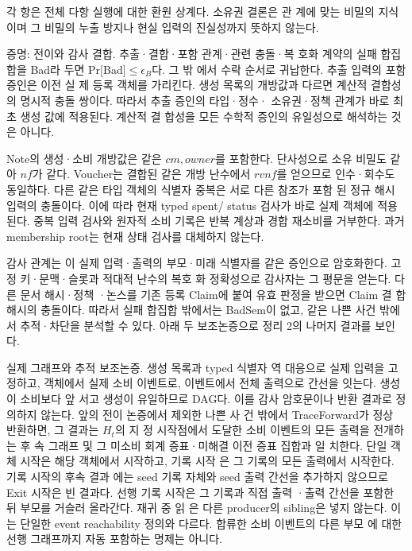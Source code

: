 각 항은 전체 다항 실행에 대한 환원 상계다. 소유권 결론은 관
계에 맞는 비밀의 지식이며 그 비밀의 누출 방지나 현실 입력의
진실성까지 뜻하지 않는다.

증명: 전이와 감사 결합. 추출·결합·포함 관계·관련 충돌·복
호화 계약의 실패 합집합을 Bad라 두면 Pr\([\)Bad\(]≤\epsilon _{B}\)다. 그 밖
에서 수락 순서로 귀납한다. 추출 입력의 포함 증인은 이전 실
제 등록 객체를 가리킨다. 생성 목록의 개방값과 다르면 계산적
결합성의 명시적 충돌 쌍이다. 따라서 추출 증인의 타입·정수·
소유권·정책 관계가 바로 최초 생성 값에 적용된다. 계산적 결
합성을 모든 수학적 증인의 유일성으로 해석하는 것은 아니다.

Note의 생성·소비 개방값은 같은 \(cm,owner\)를 포함한다.
단사성으로 소유 비밀도 같아 \(nf\)가 같다. Voucher는 결합된
같은 개방 난수에서 \(rvnf\)를 얻으므로 인수·회수도 동일하다.
다른 같은 타입 객체의 식별자 중복은 서로 다른 참조가 포함
된 정규 해시 입력의 충돌이다. 이에 따라 현재 typed spent/
status 검사가 바로 실제 객체에 적용된다. 중복 입력 검사와
원자적 소비 기록은 반복 계상과 경합 재소비를 거부한다. 과거
membership root는 현재 상태 검사를 대체하지 않는다.

감사 관계는 이 실제 입력·출력의 부모·미래 식별자를 같은
증인으로 암호화한다. 고정 키·문맥·슬롯과 적대적 난수의 복호
화 정확성으로 감사자는 그 평문을 얻는다. 다른 문서 해시·정책
·논스를 기존 등록 Claim에 붙여 유효 판정을 받으면 Claim 결
합 해시의 충돌이다. 따라서 실패 합집합 밖에서는 BadSem이
없고, 같은 나쁜 사건 밖에서 추적·차단을 분석할 수 있다. 아래
두 보조논증으로 정리 2의 나머지 결과를 보인다.

실제 그래프와 추적 보조논증. 생성 목록과 typed 식별자 역
대응으로 실제 입력을 고정하고, 객체에서 실제 소비 이벤트로,
이벤트에서 전체 출력으로 간선을 잇는다. 생성이 소비보다 앞
서고 생성이 유일하므로 DAG다. 이를 감사 암호문이나 반환
결과로 정의하지 않는다. 앞의 전이 논증에서 제외한 나쁜 사
건 밖에서 TraceForward가 정상 반환하면, 그 결과는 \(H_{t}\)의 지
정 시작점에서 도달한 소비 이벤트의 모든 출력을 전개하는 후
속 그래프 및 그 미소비 회계 증표·미해결 이전 증표 집합과 일
치한다. 단일 객체 시작은 해당 객체에서 시작하고, 기록 시작
은 그 기록의 모든 출력에서 시작한다. 기록 시작의 후속 결과
에는 seed 기록 자체와 seed 출력 간선을 추가하지 않으므로
Exit 시작은 빈 결과다. 선행 기록 시작은 그 기록과 직접 출력
·출력 간선을 포함한 뒤 부모를 거슬러 올라간다. 재귀 중 읽
은 다른 producer의 sibling은 넣지 않는다. 이는 단일한 event
reachability 정의와 다르다. 합류한 소비 이벤트의 다른 부모
에 대한 선행 그래프까지 자동 포함하는 명제는 아니다.

